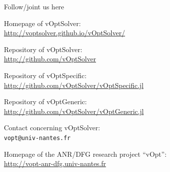 \documentclass[10pt,xcolor=dvipsnames]{beamer}
\begin{document}
\begin{frame}{Follow/joint us here}



{

Homepage of vOptSolver:\\
         \url{http://voptsolver.github.io/vOptSolver/}


\quad Repository of vOptSolver:\\
\quad         \url{http://github.com/vOptSolver}
         
\quad Repository of vOptSpecific:\\
\quad         \url{http://github.com/vOptSolver/vOptSpecific.jl}

\quad Repository of vOptGeneric:\\
\quad         \url{http://github.com/vOptSolver/vOptGeneric.jl}              




Contact concerning vOptSolver:\\
         \texttt{vopt@univ-nantes.fr}  \\
\vspace{4mm}

Homepage of the ANR/DFG research project ``vOpt'': \\
         \url{http://vopt-anr-dfg.univ-nantes.fr}


}

\end{frame}
\end{document}
